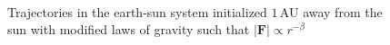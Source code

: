 \documentclass[10pt,showpacs,preprintnumbers,amsmath,amssymb,nofootinbib,aps,prl,twocolumn,groupedaddress,superscriptaddress,showkeys]{revtex4-1}
\begin{document}
    \begin{figure}[h!p]
      \\
      \caption{Trajectories in the earth-sun system initialized $1\,$AU away from the sun with modified laws of gravity such that $|\mathbf F|\propto r^{-\beta}$}
      \label{fig: escapevel varbeta}
    \end{figure}
\end{document}
